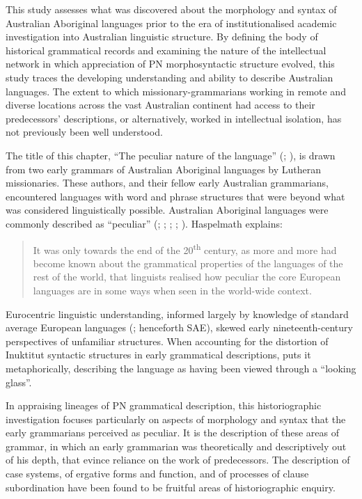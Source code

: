This study assesses what was discovered about the morphology and syntax of Australian Aboriginal languages prior to the era of institutionalised academic investigation into Australian linguistic structure. By defining the body of historical grammatical records and examining the nature of the intellectual network in which appreciation of PN morphosyntactic structure evolved, this study traces the developing understanding and ability to describe Australian languages. The extent to which missionary-grammarians working in remote and diverse locations across the vast Australian continent had access to their predecessors’ descriptions, or alternatively, worked in intellectual isolation, has not previously been well understood.

The title of this chapter, “The peculiar nature of the language'' (\citealt[vii]{meyer_vocabulary_1843}; \citealt[1]{kempe_galtjintana-pepa_1891}), is drawn from two early grammars of Australian Aboriginal languages by Lutheran missionaries. These authors, and their fellow early Australian grammarians, encountered languages with word and phrase structures that were beyond what was considered linguistically possible. Australian Aboriginal languages were commonly described as “peculiar” (\citealt[x]{threlkeld_australian_1834}; \citealt[vii]{meyer_vocabulary_1843}; \citealt[57]{gunther_grammar_1892}; \citealt[lxii]{smyth_aborigines_1878}; \citealt[315]{haeckel_history_1876}). Haspelmath explains:

\begin{quote}
It was only towards the end of the 20\textsuperscript{th} century, as more and more had become known about the grammatical properties of the languages of the rest of the world, that linguists realised how peculiar the core European languages are in some ways when seen in the world-wide context. \citep[1492]{haspelmath_european_2001}
\end{quote}

Eurocentric linguistic understanding, informed largely by knowledge of standard average European languages (\citealt{whorf_relation_1941}; henceforth SAE), skewed early nineteenth-century perspectives of unfamiliar structures. When accounting for the distortion of Inuktitut syntactic structures in early grammatical descriptions, \citet{nowak_through_1993} puts it metaphorically, describing the language as having been viewed through a “looking glass”. 

In appraising lineages of PN grammatical description, this historiographic investigation focuses particularly on aspects of morphology and syntax that the early grammarians perceived as peculiar. It is the description of these areas of grammar, in which an early grammarian was theoretically and descriptively out of his depth, that evince reliance on the work of predecessors. The description of case systems, of ergative forms and function, and of processes of clause subordination have been found to be fruitful areas of historiographic enquiry. 

